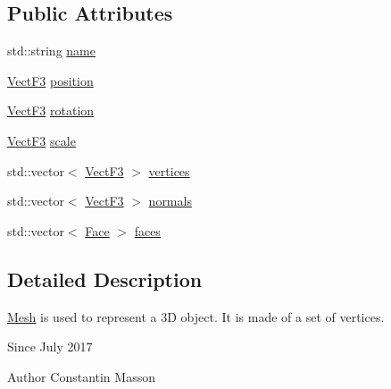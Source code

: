 \subsection*{Public Attributes}
\begin{DoxyCompactItemize}
\item 
std\-::string \hyperlink{classMesh_ac687e9dcfc7cc60b046fc2ec634200be}{name}
\item 
\hyperlink{classVectF3}{Vect\-F3} \hyperlink{classMesh_a0df7a55c33bf176617b0784990ccd997}{position}
\item 
\hyperlink{classVectF3}{Vect\-F3} \hyperlink{classMesh_a5707aace748c2a349a857ed28a3349b4}{rotation}
\item 
\hyperlink{classVectF3}{Vect\-F3} \hyperlink{classMesh_a5cc407d6c123d2fb84222ae1ebf4ab64}{scale}
\item 
std\-::vector$<$ \hyperlink{classVectF3}{Vect\-F3} $>$ \hyperlink{classMesh_aa244d2814833308fc7b96e21b71cccfd}{vertices}
\item 
std\-::vector$<$ \hyperlink{classVectF3}{Vect\-F3} $>$ \hyperlink{classMesh_a9aa46069bd2f977d5f3d088b2211f5d3}{normals}
\item 
std\-::vector$<$ \hyperlink{structFace}{Face} $>$ \hyperlink{classMesh_a9da199719905f2b213f8c0c8feba2d1f}{faces}
\end{DoxyCompactItemize}


\subsection{Detailed Description}
\hyperlink{classMesh}{Mesh} is used to represent a 3\-D object. It is made of a set of vertices.

\begin{DoxySince}{Since}
July 2017 
\end{DoxySince}
\begin{DoxyAuthor}{Author}
Constantin Masson 
\end{DoxyAuthor}


